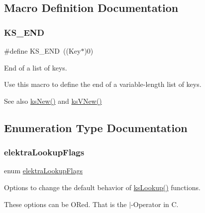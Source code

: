 \subsection{Macro Definition Documentation}
\mbox{\label{group__keyset_ga7a28fce3773b2c873c94ac80b8b4cd54}} 
\subsubsection{\texorpdfstring{K\+S\+\_\+\+E\+ND}{KS\_END}}
{\footnotesize\ttfamily \#define K\+S\+\_\+\+E\+ND~((Key$\ast$)0)}



End of a list of keys. 

Use this macro to define the end of a variable-\/length list of keys.

\begin{DoxySeeAlso}{See also}
\hyperlink{group__keyset_ga671e1aaee3ae9dc13b4834a4ddbd2c3c}{ks\+New()} and \hyperlink{group__keyset_ga4ff760f56693b51ab785ed7ce628e649}{ks\+V\+New()} 
\end{DoxySeeAlso}


\subsection{Enumeration Type Documentation}
\mbox{\label{group__keyset_gada05f4bbf46fde81d0d57df86e73d914}} 
\subsubsection{\texorpdfstring{elektra\+Lookup\+Flags}{elektraLookupFlags}}
{\footnotesize\ttfamily enum \hyperlink{group__keyset_gada05f4bbf46fde81d0d57df86e73d914}{elektra\+Lookup\+Flags}}



Options to change the default behavior of \hyperlink{group__keyset_ga60f1ddcf23272f2b29b90e92ebe9b56f}{ks\+Lookup()} functions. 

These options can be O\+Red. That is the $\vert$-\/\+Operator in C.

